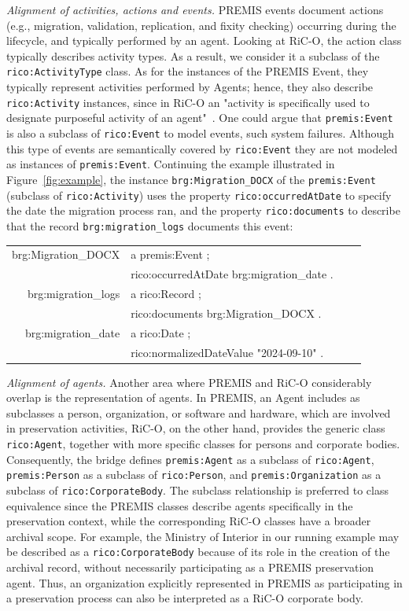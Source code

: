 \documentclass[runningheads]{llncs}
\makeatletter
\newenvironment{rdfexpressions}
{%
	\par
	\begingroup
	\centering
	\ttfamily
	\begin{tabular}{@{}r@{\ }l@{\ }l@{}l@{}}
	}
	{%
	\end{tabular}
	\par
	\endgroup
}
\makeatother
\begin{document}
\emph{Alignment of activities, actions and events.}
PREMIS events document actions (e.g., migration, validation, replication, and fixity checking) occurring during the lifecycle, and typically performed by an agent. Looking at RiC-O, the action class typically describes activity types. As a result, we consider it a subclass of the \texttt{rico:ActivityType} class. As for the instances of the PREMIS Event, they typically represent activities performed by Agents; hence, they also describe \texttt{rico:Activity} instances, since in RiC-O an "activity is specifically used to designate purposeful activity of an agent"~\cite{RICCM,RiCO}. One could argue that \texttt{premis:Event} is also a subclass of \texttt{rico:Event} to model events, such system failures. Although this type of events are semantically covered by \texttt{rico:Event} they are not modeled as instances of \texttt{premis:Event}. 
Continuing the example illustrated in Figure~\ref{fig:example}, the instance \texttt{brg:Migration\_DOCX} of the \texttt{premis:Event} (subclass of \texttt{rico:Activity}) uses the property \texttt{rico:occurredAtDate} to specify the date the migration process ran, and the property \texttt{rico:documents} to describe that the record \texttt{brg:migration\_logs} documents this event:
\begin{rdfexpressions}
	brg:Migration\_DOCX & a premis:Event ; & \\
	& rico:occurredAtDate brg:migration\_date . &\\	
	brg:migration\_logs & a rico:Record ; &\\
	& rico:documents brg:Migration\_DOCX . & \\
	brg:migration\_date & a rico:Date ; &\\
	& rico:normalizedDateValue "2024-09-10" . &
\end{rdfexpressions}
\emph{Alignment of agents.}
Another area where PREMIS and RiC-O considerably overlap is the representation
of agents. In PREMIS, an Agent includes as subclasses a person, organization, or software and hardware, which are involved in preservation activities,
RiC-O, on the other hand, provides the generic class \texttt{rico:Agent}, together with more specific classes for persons and corporate bodies. Consequently, the bridge
defines \texttt{premis:Agent} as a subclass of \texttt{rico:Agent},
\texttt{premis:Person} as a subclass of \texttt{rico:Person}, and
\texttt{premis:Organization} as a subclass of
\texttt{rico:CorporateBody}. The subclass relationship is preferred to class
equivalence since the PREMIS classes describe agents specifically in the
preservation context, while the corresponding RiC-O classes have a broader
archival scope. For example, the Ministry of Interior in our running example
may be described as a \texttt{rico:CorporateBody} because of its role in the
creation of the archival record, without necessarily participating as a PREMIS
preservation agent. Thus, an organization explicitly represented in
PREMIS as participating in a preservation process can also be interpreted as a
RiC-O corporate body.
\end{document}
